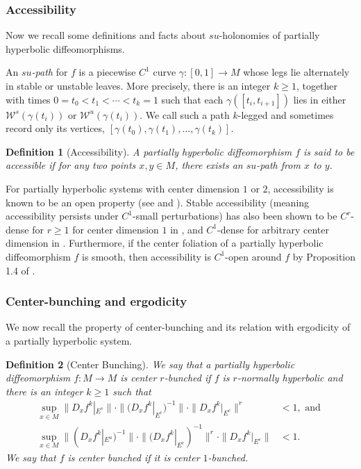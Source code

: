 \documentclass[11pt]{amsart}
\numberwithin{equation}{section}
\theoremstyle{plain}
\newtheorem{defi}{Definition}[section]
\begin{document}
\subsubsection{Accessibility}\mbox{}\par
Now we recall some definitions and facts about $su$-holonomies of partially hyperbolic diffeomorphisms.


An \emph{$su$-path} for $f$ is a piecewise $C^1$ curve
$\gamma:[0,1]\to M$  whose legs lie alternately in stable or unstable
 leaves.  More precisely, there  is an integer  $k\ge1$, together with times
$0=t_0<t_1<\cdots<t_k=1$ such that each
$\gamma([t_i,t_{i+1}])$  lies in either
 $\mathcal W^s(\gamma(t_i))$ or  $\mathcal W^u(\gamma(t_i))$.   We call such
a path $k$-legged and sometimes record only its vertices,
$[\gamma(t_0),\gamma(t_1),\ldots,\gamma(t_k)]$.


\begin{defi}[Accessibility]
A partially hyperbolic diffeomorphism $f$ is said to be \emph{accessible} if for any two points $x,y\in M$, there exists an $su$-path from $x$ to $y$.
\end{defi}

For partially hyperbolic systems with center dimension $1$ or $2$, accessibility is known to be an open property (see \cite{Didier} and \cite{AV}). Stable accessibility (meaning accessibility persists under $C^1$-small perturbations) has also been shown to be $C^r$-dense for $r\ge 1$ for center dimension $1$ in \cite{RHU}, and $C^1$-dense for arbitrary center dimension in \cite{DW}. Furthermore, if the center foliation of a partially hyperbolic diffeomorphism $f$ is smooth, then accessibility is $C^1$-open around $f$ by Proposition 1.4 of \cite{GPS}.



\subsubsection{Center-bunching and ergodicity}
We now recall the property of center-bunching and its relation with ergodicity of a partially hyperbolic system.

\begin{defi}[Center Bunching]

We say that a partially hyperbolic diffeomorphism $f:M\to M$ is
center $r$-bunched if $f$ is $r$-normally hyperbolic and there is
an integer $k\ge1$ such that
\begin{align*}
\sup_{x\in M} \|D_xf^k|_{E^s}\|\cdot \|(D_xf^k|_{E^c})^{-1}\|\cdot \|D_xf^k|_{E^c}\|^r &<1, \text{ and } \\
\sup_{x\in M} \|(D_xf^k|_{E^u})^{-1}\|\cdot \|(D_xf^k|_{E^c})^{-1}\|^r\cdot \|D_xf^k|_{E^c}\| &<1.
\end{align*}
We say that $f$ is \emph{center bunched} if it is center $1$-bunched.

\end{defi}
\end{document}
